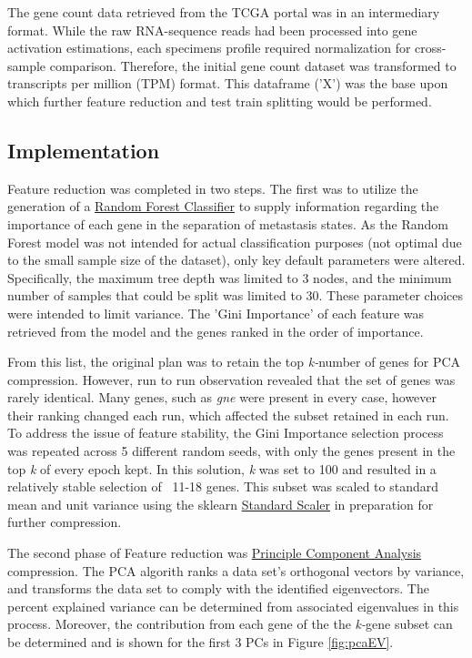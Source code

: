 \documentclass[final]{article}
\begin{document}
The gene count data retrieved from the TCGA portal was in an intermediary
format.  While the raw RNA-sequence reads had been processed into gene
activation estimations, each specimens profile required normalization for
cross-sample comparison.   Therefore, the initial gene count dataset was transformed to
transcripts per million (TPM) format.  This dataframe ('X') was the base upon
which further feature reduction and test train splitting would be performed.

\subsection{Implementation}

Feature reduction was completed in two steps.  The first was to utilize the
generation of a
\href{http://scikit-learn.org/stable/modules/generated/sklearn.ensemble.RandomForestClassifier.html#sklearn.ensemble.RandomForestClassifier}{Random
Forest Classifier} to supply information regarding the importance of each gene
in the separation of metastasis states.  As the Random Forest model was not
intended for actual classification purposes (not optimal due to the small sample
size of the dataset), only key default parameters were altered. Specifically,
the maximum tree depth was limited to 3 nodes, and the minimum number of samples
that could be split was limited to 30.  These parameter choices were intended to
limit variance.  The 'Gini Importance' of each feature was retrieved from the
model and the genes ranked in the order of importance.

From this list, the original plan was to retain the top \textit{k-}number of
genes for PCA compression.  However, run to run observation revealed that the
set of genes  was rarely identical.  Many genes, such as \textit{gne} were
present in every case, however their ranking changed each run, which affected
the subset retained in each run.  To address the issue of feature stability, the Gini
Importance selection process was repeated across 5 different random seeds, with only
the genes present in the top \textit{k} of every epoch kept.  In this
solution, \textit{k} was set to 100 and resulted in a relatively stable selection of
~11-18 genes.  This subset was scaled to standard mean and unit variance using the sklearn
\href{http://scikit-learn.org/stable/modules/generated/sklearn.preprocessing.StandardScaler.html#sklearn.preprocessing.StandardScaler}{Standard Scaler} in preparation for further compression.

The second phase of Feature reduction was \href{http://scikit-learn.org/stable/modules/generated/sklearn.decomposition.PCA.html#sklearn.decomposition.PCA}{Principle Component Analysis}
compression. The PCA algorith ranks a data set's orthogonal vectors by variance, and transforms the data set to comply with the identified eigenvectors.  The percent explained
variance can be determined from associated eigenvalues in this process.  Moreover, the contribution
from each gene of the the \textit{k-}gene subset can be determined and is shown for the first
3 PCs in Figure \ref{fig:pcaEV}.
\end{document}
